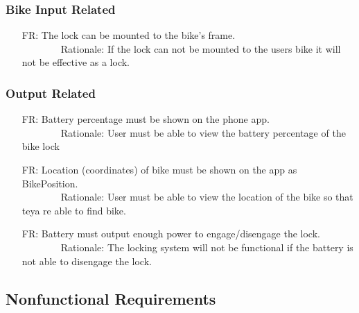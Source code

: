 \documentclass[12pt]{article}
\newcounter{reqnum} %
\begin{document}
\subsubsection{Bike Input Related}
\begin{itemize}
\setlength{\itemindent}{.5in}
\item[FR\refstepcounter{reqnum}\thereqnum\label{FR10}:] The lock can be mounted to the bike's frame.
\\ \-\ \-\ \-\ \-\ \-\ \-\ \-\ \-\ Rationale: If the lock can not be mounted to the users bike it will not be effective as a lock.
\end{itemize}

\subsubsection{Output Related}
\begin{itemize}
\setlength{\itemindent}{.5in}
\item[FR\refstepcounter{reqnum}\thereqnum\label{FR11}:] Battery percentage must be shown on the phone app.
\\ \-\ \-\ \-\ \-\ \-\ \-\ \-\ \-\ Rationale: User must be able to view the battery percentage of the bike lock
\item[FR\refstepcounter{reqnum}\thereqnum\label{FR12}:] Location (coordinates) of bike must be shown on the app as BikePosition.
\\ \-\ \-\ \-\ \-\ \-\ \-\ \-\ \-\ Rationale: User must be able to view the location of the bike so that teya re able to find bike.
\item[FR\refstepcounter{reqnum}\thereqnum\label{FR13}:] Battery must output enough power to engage/disengage the lock.
\\ \-\ \-\ \-\ \-\ \-\ \-\ \-\ \-\ Rationale: The locking system will not be functional if the battery is not able to disengage the lock.
\end{itemize}

\subsection{Nonfunctional Requirements}
\end{document}

